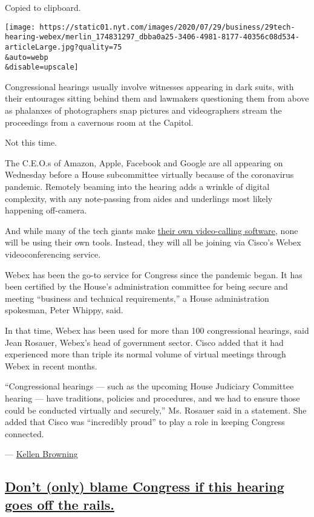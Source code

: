 Copied to clipboard.

\texttt{[image: https://static01.nyt.com/images/2020/07/29/business/29tech-hearing-webex/merlin\_174831297\_dbba0a25-3406-4981-8177-40356c08d534-articleLarge.jpg?quality=75\\\&auto=webp\\\&disable=upscale]}

Congressional hearings usually involve witnesses appearing in dark
suits, with their entourages sitting behind them and lawmakers
questioning them from above as phalanxes of photographers snap pictures
and videographers stream the proceedings from a cavernous room at the
Capitol.

Not this time.

The C.E.O.s of Amazon, Apple, Facebook and Google are all appearing on
Wednesday before a House subcommittee virtually because of the
coronavirus pandemic. Remotely beaming into the hearing adds a wrinkle
of digital complexity, with any note-passing from aides and underlings
most likely happening off-camera.

And while many of the tech giants make
\href{https://www.nytimes.com/2020/04/24/technology/zoom-rivals-virus-facebook-google.html}{their
own video-calling software}, none will be using their own tools.
Instead, they will all be joining via Cisco's Webex videoconferencing
service.

Webex has been the go-to service for Congress since the pandemic began.
It has been certified by the House's administration committee for being
secure and meeting ``business and technical requirements,'' a House
administration spokesman, Peter Whippy, said.

In that time, Webex has been used for more than 100 congressional
hearings, said Jean Rosauer, Webex's head of government sector. Cisco
added that it had experienced more than triple its normal volume of
virtual meetings through Webex in recent months.

``Congressional hearings --- such as the upcoming House Judiciary
Committee hearing --- have traditions, policies and procedures, and we
had to ensure those could be conducted virtually and securely,'' Ms.
Rosauer said in a statement. She added that Cisco was ``incredibly
proud'' to play a role in keeping Congress connected.

--- \href{https://www.nytimes.com/by/kellen-browning}{Kellen Browning}

\hypertarget{dont-only-blame-congress-if-this-hearing-goes-off-the-rails}{%
\subsection{\texorpdfstring{\protect\hyperlink{dont-only-blame-congress-if-this-hearing-goes-off-the-rails}{Don't
(only) blame Congress if this hearing goes off the
rails.}}{Don't (only) blame Congress if this hearing goes off the rails.}}\label{dont-only-blame-congress-if-this-hearing-goes-off-the-rails}}

